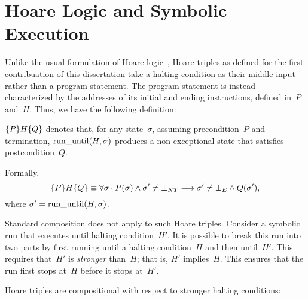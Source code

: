 \section{Hoare Logic and Symbolic Execution}
Unlike the usual formulation of
Hoare logic~\citep{hoare1969axiomatic,myreen2007hoare},
Hoare triples as defined for the first contribuation of this dissertation%
take a halting condition%
as their middle input rather than a program statement.
The program statement is instead characterized by the addresses of its initial
and ending instructions, defined in~$P$ and~$H$.
Thus, we have the following definition:
\begin{definition}\label{def:htriple}
  $\htriple{P}{H}{Q}$
  denotes that, for any state~$\sigma$, assuming precondition~$P$ and termination,
  $\run(H,\sigma)$ produces a non-exceptional state that satisfies postcondition~$Q$.
  
  Formally,
  \begin{equation}
    \htriple{P}{H}{Q}\equiv\forall\sigma\cdot
    P(\sigma)\wedge\sigma'\neq\bot_{\var{NT}}\longrightarrow
    \sigma'\neq\bot_E\wedge Q(\sigma'),
  \end{equation}
  where $\sigma'=\run(H,\sigma)$.
\end{definition}
 
Standard composition does not apply to such Hoare triples.
Consider a symbolic run that executes until halting condition~$H'$.%
It is possible to break this run into two parts
by first running until a halting condition~$H$ and then until~$H'$.
This requires that~$H'$ is \emph{stronger} than~$H$; that is, $H'$ implies~$H$.
This ensures that the run first stops at~$H$ before it stops at~$H'$.
\begin{theorem}\label{thm:comp}
  Hoare triples are compositional with respect to stronger halting conditions:
  \begin{prooftree}
  \end{prooftree}
\end{theorem}

